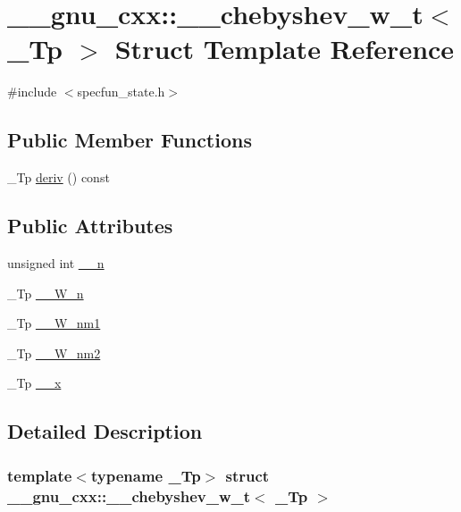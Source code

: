 \hypertarget{struct____gnu__cxx_1_1____chebyshev__w__t}{}\section{\+\_\+\+\_\+gnu\+\_\+cxx\+:\+:\+\_\+\+\_\+chebyshev\+\_\+w\+\_\+t$<$ \+\_\+\+Tp $>$ Struct Template Reference}
\label{struct____gnu__cxx_1_1____chebyshev__w__t}


{\ttfamily \#include $<$specfun\+\_\+state.\+h$>$}

\subsection*{Public Member Functions}
\begin{DoxyCompactItemize}
\item 
\+\_\+\+Tp \hyperlink{struct____gnu__cxx_1_1____chebyshev__w__t_a12989ea093bebe65f3d35dbfe3a6dc92}{deriv} () const
\end{DoxyCompactItemize}
\subsection*{Public Attributes}
\begin{DoxyCompactItemize}
\item 
unsigned int \hyperlink{struct____gnu__cxx_1_1____chebyshev__w__t_a32cb7428d8402e9a3846fd41b0f16ca2}{\+\_\+\+\_\+n}
\item 
\+\_\+\+Tp \hyperlink{struct____gnu__cxx_1_1____chebyshev__w__t_afc4ed50573ce3685a722f2a1c06c3f4a}{\+\_\+\+\_\+\+W\+\_\+n}
\item 
\+\_\+\+Tp \hyperlink{struct____gnu__cxx_1_1____chebyshev__w__t_aaae8db01cc3fd06a149999c2ca746727}{\+\_\+\+\_\+\+W\+\_\+nm1}
\item 
\+\_\+\+Tp \hyperlink{struct____gnu__cxx_1_1____chebyshev__w__t_aa57afad6442e25e0f6037c1de9fab7e8}{\+\_\+\+\_\+\+W\+\_\+nm2}
\item 
\+\_\+\+Tp \hyperlink{struct____gnu__cxx_1_1____chebyshev__w__t_a812c1414d20763ecd27f95c244a727eb}{\+\_\+\+\_\+x}
\end{DoxyCompactItemize}


\subsection{Detailed Description}
\subsubsection*{template$<$typename \+\_\+\+Tp$>$\newline
struct \+\_\+\+\_\+gnu\+\_\+cxx\+::\+\_\+\+\_\+chebyshev\+\_\+w\+\_\+t$<$ \+\_\+\+Tp $>$}

